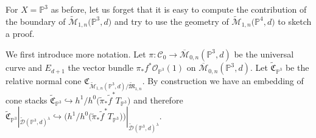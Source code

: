 \documentclass[pdftex]{sigma}
\numberwithin{equation}{section}
\newcommand{\PP}{\mathbb P}
\begin{document}
\begin{Remark}For $X=\PP^3$ as before, let us forget that it is easy to compute the contribution of the boundary of $\widetilde{\mathcal{M}}_{1,n}\big(\PP^3,d\big)$ and try to use the geometry of $\widetilde{\mathcal{M}}_{1,n}\big(\PP^4,d\big)$ to sketch a proof.

We first introduce more notation. Let $\pi\colon \mathcal{C}_0\to \overline{\mathcal{M}}_{0,n}(\PP^3,d)$ be the universal curve and $E_{d+1}$ the vector bundle $\pi_*f^*\mathcal{O}_{\PP^3}(1)$ on $\overline{\mathcal{M}}_{0,n}(\PP^3,d)$. Let $\widetilde{\mathfrak{C}}_{\PP^3}$ be the relative normal cone $\mathfrak{C}_{\widetilde{\mathcal{M}}_{1,n}(\PP^3,d)/\widetilde{\mathfrak{M}}_{1,n}}$. By construction we have an embedding of cone stacks $\widetilde{\mathfrak{C}}_{\PP^3}\hookrightarrow h^1/h^0\big(\widetilde{\pi}_*\widetilde{f}^*T_{\PP^3}\big)$ and therefore $\widetilde{\mathfrak{C}}_{\PP^3}|_{\widetilde{\mathcal{D}}(\PP^3,d)^{\lambda}}\hookrightarrow \big(h^1/h^0(\widetilde{\pi}_*\widetilde{f}^*T_{\PP^3}\big)\big)|_{\widetilde{\mathcal{D}} (\PP^3,d)^{\lambda}}$.


\end{Remark}
\end{document}
